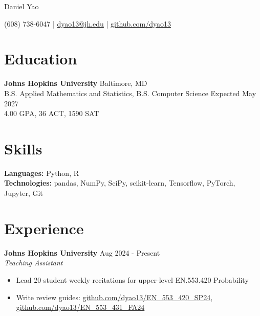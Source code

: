 \documentclass[11pt]{article}       %
\begin{document}
\centerline{\Huge Daniel Yao}

\vspace{5pt}

\centerline{(608) 738-6047 | \href{mailto:dyao13@jh.edu}{dyao13@jh.edu} | \href{https://github.com/dyao13/}{github.com/dyao13}}

\vspace{-9pt}

\section*{Education}

\textbf{Johns Hopkins University} \hfill Baltimore, MD \\
B.S. Applied Mathematics and Statistics, B.S. Computer Science \hfill Expected May 2027 \\
4.00 GPA, 36 ACT, 1590 SAT \\

\vspace{-9pt}

\section*{Skills}

\textbf{Languages:} Python, R \\
\textbf{Technologies:} pandas, NumPy, SciPy, scikit-learn, Tensorflow, PyTorch, Jupyter, Git

\vspace{-9pt}

\section*{Experience}

\textbf{Johns Hopkins University} \hfill Aug 2024 - Present \\
\textit{Teaching Assistant} \vspace{-9pt} \\
\begin{itemize}
  \item Lead 20-student weekly recitations for upper-level EN.553.420 Probability
  \item Write review guides: \href{https://github.com/dyao13/EN_553_420_SP24}{github.com/dyao13/EN\_553\_420\_SP24}, \href{https://github.com/dyao13/EN_553_431_FA24}{github.com/dyao13/EN\_553\_431\_FA24}
\end{itemize}
\end{document}
